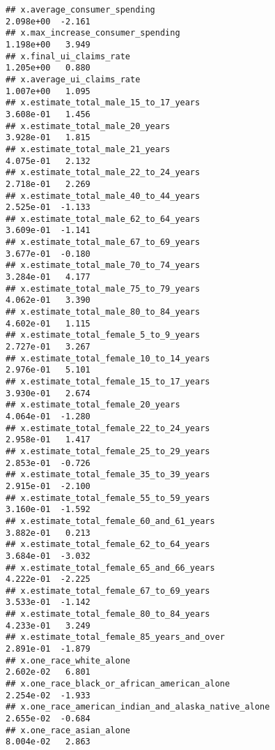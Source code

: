 \documentclass[
]{article}
\begin{document}
\begin{verbatim}
## x.average_consumer_spending                                  2.098e+00  -2.161
## x.max_increase_consumer_spending                             1.198e+00   3.949
## x.final_ui_claims_rate                                       1.205e+00   0.880
## x.average_ui_claims_rate                                     1.007e+00   1.095
## x.estimate_total_male_15_to_17_years                         3.608e-01   1.456
## x.estimate_total_male_20_years                               3.928e-01   1.815
## x.estimate_total_male_21_years                               4.075e-01   2.132
## x.estimate_total_male_22_to_24_years                         2.718e-01   2.269
## x.estimate_total_male_40_to_44_years                         2.525e-01  -1.133
## x.estimate_total_male_62_to_64_years                         3.609e-01  -1.141
## x.estimate_total_male_67_to_69_years                         3.677e-01  -0.180
## x.estimate_total_male_70_to_74_years                         3.284e-01   4.177
## x.estimate_total_male_75_to_79_years                         4.062e-01   3.390
## x.estimate_total_male_80_to_84_years                         4.602e-01   1.115
## x.estimate_total_female_5_to_9_years                         2.727e-01   3.267
## x.estimate_total_female_10_to_14_years                       2.976e-01   5.101
## x.estimate_total_female_15_to_17_years                       3.930e-01   2.674
## x.estimate_total_female_20_years                             4.064e-01  -1.280
## x.estimate_total_female_22_to_24_years                       2.958e-01   1.417
## x.estimate_total_female_25_to_29_years                       2.853e-01  -0.726
## x.estimate_total_female_35_to_39_years                       2.915e-01  -2.100
## x.estimate_total_female_55_to_59_years                       3.160e-01  -1.592
## x.estimate_total_female_60_and_61_years                      3.882e-01   0.213
## x.estimate_total_female_62_to_64_years                       3.684e-01  -3.032
## x.estimate_total_female_65_and_66_years                      4.222e-01  -2.225
## x.estimate_total_female_67_to_69_years                       3.533e-01  -1.142
## x.estimate_total_female_80_to_84_years                       4.233e-01   3.249
## x.estimate_total_female_85_years_and_over                    2.891e-01  -1.879
## x.one_race_white_alone                                       2.602e-02   6.801
## x.one_race_black_or_african_american_alone                   2.254e-02  -1.933
## x.one_race_american_indian_and_alaska_native_alone           2.655e-02  -0.684
## x.one_race_asian_alone                                       8.004e-02   2.863

\end{verbatim}
\end{document}
